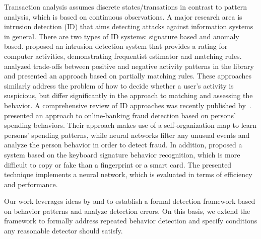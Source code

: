 Transaction analysis assumes discrete states/transations in contrast to pattern analysis, which is based on continuous observations. A major research area is intrusion detection (ID) that aims detecting attacks against information systems in general. There are two types of ID systems: signature based and anomaly based. \cite{Helman1993} proposed an intrusion detection system that provides a rating for computer activities, demonstrating frequentist estimator  and matching rules. \cite{Esponda2004} analyzed trade-offs between positive and negative activity patterns in the library and presented an approach based on partially matching rules. These approaches similarly address the problem of how to decide whether a user's activity is suspicious, but differ significantly in the approach to matching and assessing the  behavior. A comprehensive review of ID approaches was recently published by~\cite{Gyanchandani2012}. \citet{Quah2008} presented an approach to online-banking fraud detection based on persons' spending behaviors. Their approach makes use of a self-organization map to learn persons' spending patterns, while neural networks filter any unusual events and analyze the person behavior in order to detect fraud. In addition, \citet{Alexandre1997}  proposed a system based on the keyboard signature behavior recognition, which is more difficult to copy or fake than a fingerprint or a smart card. The presented technique implements a neural network, which is evaluated in terms of efficiency and performance. 

Our work leverages ideas by \cite{Helman1993} and \citet{Esponda2004} to establish a formal detection framework based on behavior patterns and analyze detection errors. On this basis, we extend the framework to formally address repeated behavior detection and specify conditions any reasonable detector should satisfy.


